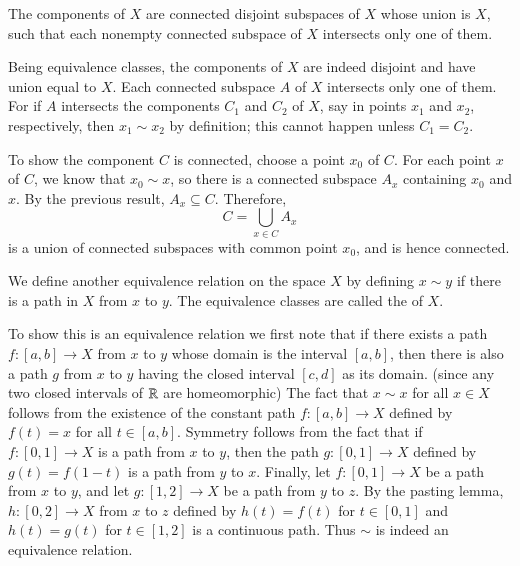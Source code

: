 \documentclass[12pt, a4paper, twoside, openright, titlepage]{book}
\begin{document}
\begin{thm}{}{}
    The components of $X$ are connected disjoint subspaces of $X$ whose union is $X$, such that each nonempty connected subspace of $X$ intersects only one of them.
\end{thm}
\begin{proof*}{}{}
    Being equivalence classes, the components of $X$ are indeed disjoint and have union equal to $X$. Each connected subspace $A$ of $X$ intersects only one of them. For if $A$ intersects the components $C_1$ and $C_2$ of $X$, say in points $x_1$ and $x_2$, respectively, then $x_1 \sim x_2$ by definition; this cannot happen unless $C_1 = C_2$.

    To show the component $C$ is connected, choose a point $x_0$ of $C$. For each point $x$ of $C$, we know that $x_0 \sim x$, so there is a connected subspace $A_x$ containing $x_0$ and $x$. By the previous result, $A_x \subseteq C$. Therefore, \begin{equation*}
        C = \bigcup\limits_{x\in C} A_x
    \end{equation*}
    is a union of connected subspaces with common point $x_0$, and is hence connected.
\end{proof*}

\begin{defn}{}{}
    We define another equivalence relation on the space $X$ by defining $x \sim y$ if there is a path in $X$ from $x$ to $y$. The equivalence classes are called the  of $X$.
\end{defn}

To show this is an equivalence relation we first note that if there exists a path $f:[a,b]\rightarrow X$ from $x$ to $y$ whose domain is the interval $[a,b]$, then there is also a path $g$ from $x$ to $y$ having the closed interval $[c,d]$ as its domain. (since any two closed intervals of $\mathbb R$ are homeomorphic) The fact that $x \sim x$ for all $x \in X$ follows from the existence of the constant path $f:[a,b]\rightarrow X$ defined by $f(t) = x$ for all $t \in [a,b]$. Symmetry follows from the fact that if $f:[0,1]\rightarrow X$ is a path from $x$ to $y$, then the path $g:[0,1]\rightarrow X$ defined by $g(t) = f(1-t)$ is a path from $y$ to $x$. Finally, let $f:[0,1]\rightarrow X$ be a path from $x$ to $y$, and let $g:[1,2]\rightarrow X$ be a path from $y$ to $z$. By the pasting lemma, $h:[0,2]\rightarrow X$ from $x$ to $z$ defined by $h(t) = f(t)$ for $t \in [0,1]$ and $h(t) = g(t)$ for $t \in [1,2]$ is a continuous path. Thus $\sim$ is indeed an equivalence relation.
\end{document}
